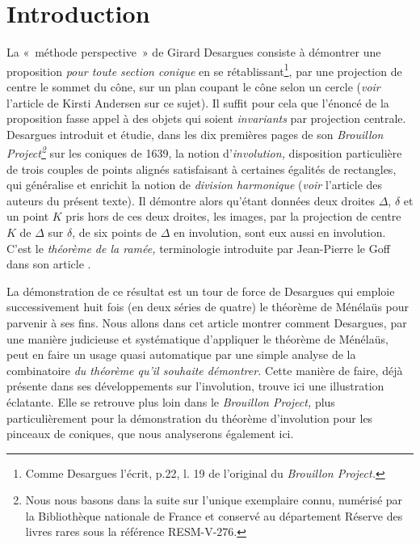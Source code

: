 \documentclass[12pt, a4paper]{article}
\begin{document}
\vspace*{1cm}


\section*{Introduction}
La «~méthode perspective~» de Girard Desargues consiste à démontrer une proposition \textit{pour toute section conique} en se rétablissant\footnote{Comme Desargues l'écrit, p.22, l. 19 de l'original du \textit{Brouillon Project.}}, par une projection de centre le sommet du cône, sur un plan coupant le cône selon un cercle ({\it voir} l'article \cite{andersen} de Kirsti Andersen sur ce sujet). Il suffit pour cela que l'énoncé de la proposition fasse appel à des objets qui soient \textit{invariants} par projection centrale. Desargues introduit et étudie, dans les dix premières pages de son \textit{Brouillon Project\footnote{Nous nous basons dans la suite sur l'unique exemplaire connu, numérisé par la Bibliothèque nationale de France et conservé au département Réserve des livres rares sous la référence RESM-V-276.}} sur les coniques de 1639, la notion d'\textit{involution,} disposition particulière de trois couples de points alignés satisfaisant à certaines égalités de rectangles, qui généralise et enrichit la notion de \textit{division harmonique} (\textit{voir} l'article \cite{anglade-briend-1} des auteurs du présent texte). Il démontre alors qu'étant données deux droites $\Delta$, $\delta$ et un point $K$ pris hors de ces deux droites,  les images, par la projection de centre $K$ de $\Delta$ sur $\delta$, de six points de $\Delta$ en involution,  sont eux aussi en involution. C'est le \textit{théorème de la ramée,} terminologie introduite par Jean-Pierre le Goff dans son article \cite{legoff}. 

La démonstration de ce résultat est un tour de force de Desargues qui emploie successivement huit fois (en deux séries de quatre) le théorème de Ménélaüs pour parvenir à ses fins. Nous allons dans cet article montrer comment Desargues, par une manière judicieuse et systématique d'appliquer le théorème de Ménélaüs, peut en faire un usage quasi automatique par une simple analyse de la combinatoire \textit{du théorème qu'il souhaite démontrer.} Cette manière de faire, déjà présente dans ses développements sur l'involution, trouve ici une illustration éclatante. Elle se retrouve plus loin dans le \textit{Brouillon Project,} plus particulièrement pour la démonstration du théorème d'involution pour les pinceaux de coniques, que nous analyserons également ici.
\end{document}

